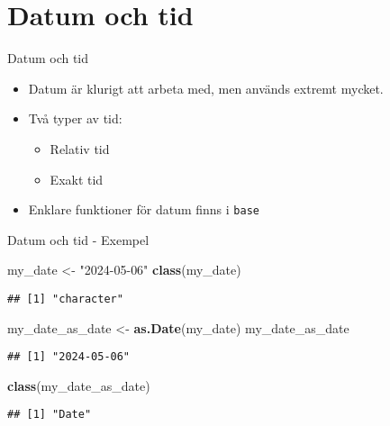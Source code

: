 \documentclass[
  11pt,
  ignorenonframetext,
  handout]{beamer}
\newenvironment{Shaded}{\begin{snugshade}}{\end{snugshade}}
\newcommand{\FunctionTok}[1]{\textcolor[rgb]{0.13,0.29,0.53}{\textbf{#1}}}
\newcommand{\NormalTok}[1]{#1}
\newcommand{\OtherTok}[1]{\textcolor[rgb]{0.56,0.35,0.01}{#1}}
\newcommand{\StringTok}[1]{\textcolor[rgb]{0.31,0.60,0.02}{#1}}
\providecommand{\tightlist}{%
  \setlength{\itemsep}{0pt}\setlength{\parskip}{0pt}}
\begin{document}
\section{Datum och tid}\label{datum-och-tid}

\begin{frame}{Datum och tid}
\label{datum-och-tid-1}
\begin{itemize}
\tightlist
\item
  Datum är klurigt att arbeta med, men används extremt mycket.
\item
  Två typer av tid:

  \begin{itemize}
  \tightlist
  \item
    Relativ tid
  \item
    Exakt tid
  \end{itemize}
\item
  Enklare funktioner för datum finns i \texttt{base}
\end{itemize}
\end{frame}

\begin{frame}[fragile]{Datum och tid - Exempel}
\label{datum-och-tid---exempel}
\begin{Shaded}
\begin{Highlighting}[]
\NormalTok{my\_date }\OtherTok{\textless{}{-}} \StringTok{"2024{-}05{-}06"}
\FunctionTok{class}\NormalTok{(my\_date)}
\end{Highlighting}
\end{Shaded}

\begin{verbatim}
## [1] "character"
\end{verbatim}

\begin{Shaded}
\begin{Highlighting}[]
\NormalTok{my\_date\_as\_date }\OtherTok{\textless{}{-}} \FunctionTok{as.Date}\NormalTok{(my\_date)}
\NormalTok{my\_date\_as\_date}
\end{Highlighting}
\end{Shaded}

\begin{verbatim}
## [1] "2024-05-06"
\end{verbatim}

\begin{Shaded}
\begin{Highlighting}[]
\FunctionTok{class}\NormalTok{(my\_date\_as\_date)}
\end{Highlighting}
\end{Shaded}

\begin{verbatim}
## [1] "Date"
\end{verbatim}
\end{frame}
\end{document}
